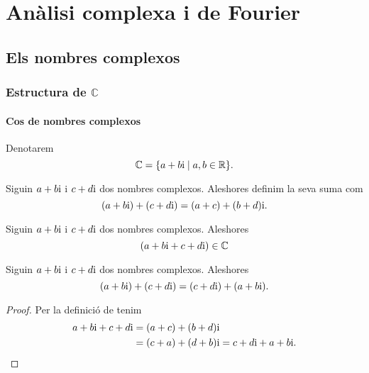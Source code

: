 \documentclass[../Apunts.tex]{subfiles}
\begin{document}
\part{Anàlisi complexa i de Fourier}
\chapter{Els nombres complexos}
\section{Estructura de \ensuremath{\mathbb{C}}}
	\subsection{Cos de nombres complexos}
	\begin{notation}
		\label{notation:cos de nombres complexos}
		Denotarem
		\[\mathbb{C}=\{a+b\mathrm{i}\mid a,b\in\mathbb{R}\}.\]
	\end{notation}
	\begin{definition}
		\label{def:suma de nombres complexos}
		Siguin \(a+b\mathrm{i}\) i \(c+d\mathrm{i}\) dos nombres complexos. Aleshores definim la seva suma com
		\[(a+b\mathrm{i})+(c+d\mathrm{i})=(a+c)+(b+d)\mathrm{i}.\]
	\end{definition}
	\begin{observation}
		\label{obs:els nombres complexos estan tancats per la suma}
		Siguin \(a+b\mathrm{i}\) i \(c+d\mathrm{i}\) dos nombres complexos. Aleshores
		\[(a+b\mathrm{i}+c+d\mathrm{i})\in\mathbb{C}\]
	\end{observation}
	\begin{proposition}
		\label{prop:els nombres complexos commuten per la suma}
		Siguin \(a+b\mathrm{i}\) i \(c+d\mathrm{i}\) dos nombres complexos. Aleshores
		\[(a+b\mathrm{i})+(c+d\mathrm{i})=(c+d\mathrm{i})+(a+b\mathrm{i}).\]
		\begin{proof}
			Per la definició de  tenim
			\begin{align*}
				a+b\mathrm{i}+c+d\mathrm{i}&=(a+c)+(b+d)\mathrm{i} \\
				&=(c+a)+(d+b)\mathrm{i}=c+d\mathrm{i}+a+b\mathrm{i}.\qedhere
			\end{align*}
		\end{proof}
	\end{proposition}
\end{document}
